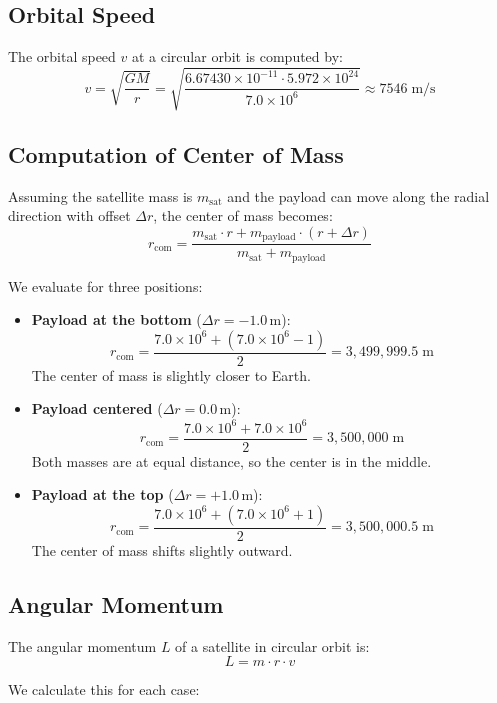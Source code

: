 \documentclass[conference]{IEEEtran}
\begin{document}
\subsection{Orbital Speed}
The orbital speed $v$ at a circular orbit is computed by:
\[
v = \sqrt{\frac{GM}{r}} = \sqrt{\frac{6.67430 \times 10^{-11} \cdot 5.972 \times 10^{24}}{7.0 \times 10^6}} \approx 7546 \; \text{m/s}
\]

\subsection{Computation of Center of Mass}
Assuming the satellite mass is $m_\text{sat}$ and the payload can move along the radial direction with offset $\Delta r$, the center of mass becomes:
\[
r_\text{com} = \frac{m_\text{sat} \cdot r + m_\text{payload} \cdot (r + \Delta r)}{m_\text{sat} + m_\text{payload}}
\]

We evaluate for three positions:

\begin{itemize}
  \item \textbf{Payload at the bottom} ($\Delta r = -1.0 \, \text{m}$):
  \[
  r_\text{com} = \frac{7.0 \times 10^6 + (7.0 \times 10^6 - 1)}{2} = 3,499,999.5 \; \text{m}
  \]
  The center of mass is slightly closer to Earth.

  \item \textbf{Payload centered} ($\Delta r = 0.0 \, \text{m}$):
  \[
  r_\text{com} = \frac{7.0 \times 10^6 + 7.0 \times 10^6}{2} = 3,500,000 \; \text{m}
  \]
  Both masses are at equal distance, so the center is in the middle.

  \item \textbf{Payload at the top} ($\Delta r = +1.0 \, \text{m}$):
  \[
  r_\text{com} = \frac{7.0 \times 10^6 + (7.0 \times 10^6 + 1)}{2} = 3,500,000.5 \; \text{m}
  \]
  The center of mass shifts slightly outward.
\end{itemize}

\subsection{Angular Momentum}
The angular momentum $L$ of a satellite in circular orbit is:
\[
L = m \cdot r \cdot v
\]

We calculate this for each case:
\end{document}
